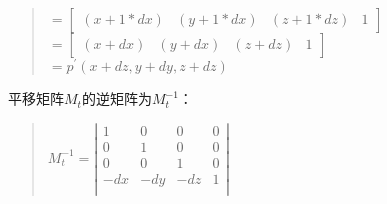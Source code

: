 \documentclass[a4paper,10pt]{article}
\begin{document}
\begin{CJK}{UTF8}{song}
\begin{quote}
\begin{math}
=[ \begin{array}{cccc} (x+1*dx) & (y+1*dx) & (z+1*dz) & 1  \end{array} ]
\end{math}  \\

\begin{math}
=[ \begin{array}{cccc} (x+dx) & (y+dx) & (z+dz) & 1  \end{array} ]
\end{math}  \\

\begin{math}
=p^{'}(x+dz,y+dy,z+dz)
\end{math}
\end{quote}
平移矩阵$M_{t}$的逆矩阵为$M_{t}^{-1}$：
\begin{quote}
\begin{math}
M_{t}^{-1}=\left|
\begin{array}{cccc}
1&0&0&0 \\
0&1&0&0 \\
0&0&1&0 \\
-dx&-dy&-dz&1 \\
\end{array}
\right|
\end{math}
\end{quote}

\end{CJK}
\end{document}
